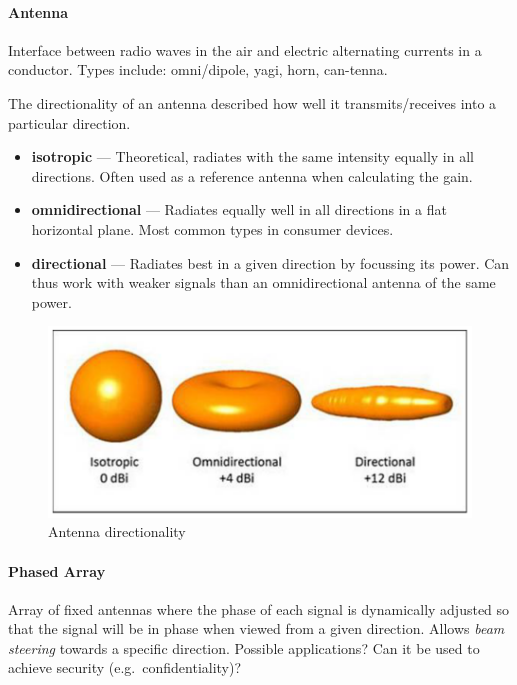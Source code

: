 \paragraph{Antenna}
Interface between radio waves in the air and electric alternating currents in a conductor.
Types include: omni/dipole, yagi, horn, can-tenna.

The directionality of an antenna described how well it transmits/receives into a particular direction.
\begin{itemize}
	\item \textbf{isotropic} --- Theoretical, radiates with the same intensity equally in all directions. Often used as a reference antenna when calculating the gain.
	\item \textbf{omnidirectional} --- Radiates equally well in all directions in a flat horizontal plane. Most common types in consumer devices.
	\item \textbf{directional} --- Radiates best in a given direction by focussing its power. Can thus work with weaker signals than an omnidirectional antenna of the same power.
\end{itemize}

\begin{figure}[h]
	\centering
	\includegraphics[scale=0.4]{images/1-directionality.png}
	\caption{Antenna directionality}%
	\label{fig:directionality}
\end{figure}

\paragraph{Phased Array}
Array of fixed antennas where the phase of each signal is dynamically adjusted so that the signal will be in phase when viewed from a given direction.
Allows \textit{beam steering} towards a specific direction.
Possible applications? Can it be used to achieve security (e.g.\ confidentiality)?


